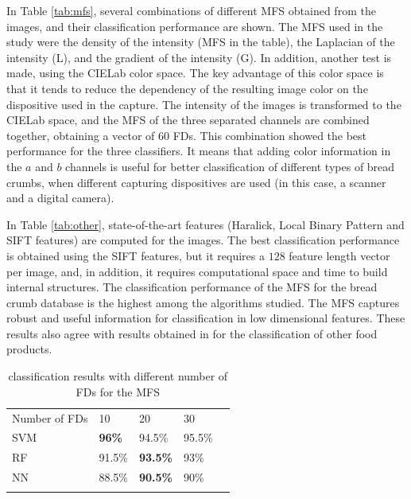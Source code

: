 In Table \ref{tab:mfs}, several combinations of different MFS obtained from the images, and their classification performance are shown. The MFS used in the study were the density of the intensity (MFS in the table), the Laplacian of the intensity (L), and the gradient of the intensity (G). In addition, another test is made, using the CIELab color space. The key advantage of this color space is that it tends to reduce the dependency of the resulting image color on the dispositive used in the capture. The intensity of the images is transformed to the CIELab space, and the MFS of the three separated channels are combined together, obtaining a vector of $60$ FDs. This combination showed the best performance for the three classifiers. It means that adding color information in the $a$ and $b$ channels is useful for better classification of different types of bread crumbs, when different capturing dispositives are used (in this case, a scanner and a digital camera).

In Table \ref{tab:other}, state-of-the-art features (Haralick, Local Binary Pattern and SIFT features) are computed for the images. The best classification performance is obtained using the SIFT features, but it requires a $128$ feature length vector per image, and, in addition, it requires computational space and time to build internal structures. The classification performance of the MFS for the bread crumb database is the highest among the algorithms studied. The MFS captures robust and useful information for classification in low dimensional features. These results also agree with results obtained in \cite{Bosch2011} for the classification of other food products.

\begin{table}
\caption{classification results with different number of FDs for the MFS}
\label{tab:number}       %
\begin{tabular}{lllll}
\hline\noalign{\smallskip}
Number of FDs & 10  & 20 & 30 \\
\noalign{\smallskip}\hline\noalign{\smallskip}
SVM & \textbf{96\%} & 94.5\% & 95.5\% \\
RF  & 91.5\% & \textbf{93.5\%} & 93\% \\
NN & 88.5\% & \textbf{90.5\%} & 90\% \\
\noalign{\smallskip}\hline
\end{tabular}
\end{table}


